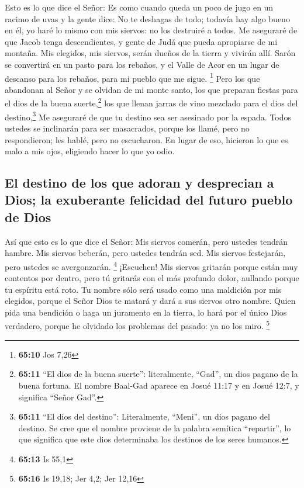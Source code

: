  Esto es lo que dice el Señor: Es como cuando queda un
poco de jugo en un racimo de uvas y la gente dice: No te deshagas de
todo; todavía hay algo bueno en él, yo haré lo mismo con mis siervos: no
los destruiré a todos.  Me aseguraré de que Jacob tenga
descendientes, y gente de Judá que pueda apropiarse de mi montaña. Mis
elegidos, mis siervos, serán dueños de la tierra y vivirán allí.
 Sarón se convertirá en un pasto para los rebaños, y el
Valle de Acor en un lugar de descanso para los rebaños, para mi pueblo
que me sigue. \footnote{\textbf{65:10} Jos 7,26}  Pero
los que abandonan al Señor y se olvidan de mi monte santo, los que
preparan fiestas para el dios de la buena suerte,\footnote{\textbf{65:11}
  ``El dios de la buena suerte'': literalmente, ``Gad'', un dios pagano
  de la buena fortuna. El nombre Baal-Gad aparece en Josué 11:17 y en
  Josué 12:7, y significa ``Señor Gad''.} los que llenan jarras de vino
mezclado para el dios del destino,\footnote{\textbf{65:11} ``El dios del
  destino'': Literalmente, ``Meni'', un dios pagano del destino. Se cree
  que el nombre proviene de la palabra semítica ``repartir'', lo que
  significa que este dios determinaba los destinos de los seres humanos.}
 Me aseguraré de que tu destino sea ser asesinado por la
espada. Todos ustedes se inclinarán para ser masacrados, porque los
llamé, pero no respondieron; les hablé, pero no escucharon. En lugar de
eso, hicieron lo que es malo a mis ojos, eligiendo hacer lo que yo odio.

\hypertarget{el-destino-de-los-que-adoran-y-desprecian-a-dios-la-exuberante-felicidad-del-futuro-pueblo-de-dios}{%
\subsection{El destino de los que adoran y desprecian a Dios; la
exuberante felicidad del futuro pueblo de
Dios}\label{el-destino-de-los-que-adoran-y-desprecian-a-dios-la-exuberante-felicidad-del-futuro-pueblo-de-dios}}

 Así que esto es lo que dice el Señor: Mis siervos
comerán, pero ustedes tendrán hambre. Mis siervos beberán, pero ustedes
tendrán sed. Mis siervos festejarán, pero ustedes se avergonzarán.
\footnote{\textbf{65:13} Is 55,1}  ¡Escuchen! Mis siervos
gritarán porque están muy contentos por dentro, pero tú gritarás con el
más profundo dolor, aullando porque tu espíritu está roto.
 Tu nombre sólo será usado como una maldición por mis
elegidos, porque el Señor Dios te matará y dará a sus siervos otro
nombre.  Quien pida una bendición o haga un juramento en
la tierra, lo hará por el único Dios verdadero, porque he olvidado los
problemas del pasado: ya no los miro. \footnote{\textbf{65:16} Is 19,18;
  Jer 4,2; Jer 12,16}

